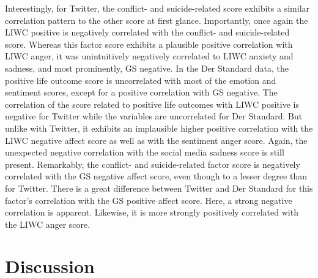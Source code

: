 \documentclass[
  english,
  jou,floatsintext]{apa7}
\begin{document}
Interestingly, for Twitter, the conflict- and suicide-related score exhibits a similar correlation pattern to the other score at first glance. Importantly, once again the LIWC positive is negatively correlated with the conflict- and suicide-related score. Whereas this factor score exhibits a plausible positive correlation with LIWC anger, it was unintuitively negatively correlated to LIWC anxiety and sadness, and most prominently, GS negative.
In the Der Standard data, the positive life outcome score is uncorrelated with most of the emotion and sentiment scores, except for a positive correlation with GS negative. The correlation of the score related to positive life outcomes with LIWC positive is negative for Twitter while the variables are uncorrelated for Der Standard.
But unlike with Twitter, it exhibits an implausible higher positive correlation with the LIWC negative affect score as well as with the sentiment anger score. Again, the unexpected negative correlation with the social media sadness score is still present. Remarkably, the conflict- and suicide-related factor score is negatively correlated with the GS negative affect score, even though to a lesser degree than for Twitter. There is a great difference between Twitter and Der Standard for this factor's correlation with the GS positive affect score. Here, a strong negative correlation is apparent. Likewise, it is more strongly positively correlated with the LIWC anger score.

\hypertarget{discussion}{%
\section{Discussion}\label{discussion}}
\end{document}
